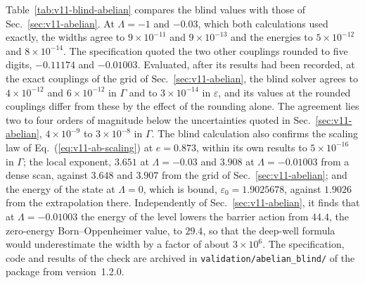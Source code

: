 Table~\ref{tab:v11-blind-abelian} compares the blind values with those of Sec.~\ref{sec:v11-abelian}.
At $\Lambda=-1$ and $-0.03$, which both calculations used exactly, the widths agree to $9\times10^{-11}$ and $9\times10^{-13}$ and the energies to $5\times10^{-12}$ and $8\times10^{-14}$. %
The specification quoted the two other couplings rounded to five digits, $-0.11174$ and $-0.01003$.
Evaluated, after its results had been recorded, at the exact couplings of the grid of Sec.~\ref{sec:v11-abelian}, the blind solver agrees to $4\times10^{-12}$ and $6\times10^{-12}$ in $\Gamma$ and to $3\times10^{-14}$ in $\varepsilon$, and its values at the rounded couplings differ from these by the effect of the rounding alone. %
The agreement lies two to four orders of magnitude below the uncertainties quoted in Sec.~\ref{sec:v11-abelian}, $4\times10^{-9}$ to $3\times10^{-8}$ in $\Gamma$. %
The blind calculation also confirms the scaling law of Eq.~(\ref{eq:v11-ab-scaling}) at $e=0.873$, within its own results to $5\times10^{-16}$ in $\Gamma$; the local exponent, $3.651$ at $\Lambda=-0.03$ and $3.908$ at $\Lambda=-0.01003$ from a dense scan, against $3.648$ and $3.907$ from the grid of Sec.~\ref{sec:v11-abelian}; and the energy of the state at $\Lambda=0$, which is bound, $\varepsilon_0=1.9025678$, against $1.9026$ from the extrapolation there. %
Independently of Sec.~\ref{sec:v11-abelian}, it finds that at $\Lambda=-0.01003$ the energy of the level lowers the barrier action from $44.4$, the zero-energy Born--Oppenheimer value, to $29.4$, so that the deep-well formula would underestimate the width by a factor of about $3\times10^6$. %
The specification, code and results of the check are archived in \texttt{validation/\allowbreak abelian\_blind/} of the package from version~1.2.0.

